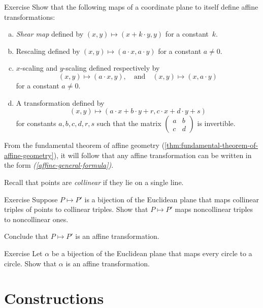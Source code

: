 \begin{thm}[!]{Exercise}\label{ex:afine-linear}
Show that the following maps of a coordinate plane to itself define affine transformations:
\begin{enumerate}[(a)]
\item\label{ex:afine-linear:shear} \emph{Shear map} defined by $(x,y)\mapsto (x+k\cdot y,y)$ for a constant~$k$.
\item\label{ex:afine-linear:scaling}
Rescaling defined by $(x,y)\mapsto (a\cdot x,a\cdot y)$ for a constant $a\ne 0$.
\item $x$-scaling and $y$-scaling defined respectively by 
\[(x,y)\mapsto (a\cdot x,y),\quad\text{and}\quad(x,y)\mapsto (x,a\cdot y)\]
for a constant $a\ne 0$.
\item\label{affine-general-formula} A transformation defined by
\[(x,y)\mapsto(a\cdot x+b\cdot y+r,c\cdot x+d\cdot y+s)\]
for constants $a,b,c,d,r,s$ such that the matrix $(\begin{smallmatrix}a&b\\c&d\end{smallmatrix})$ is invertible. 
\end{enumerate}
\end{thm}

From the fundamental theorem of affine geometry (\ref{thm:fundamental-theorem-of-affine-geometry}), it will follow that any affine transformation can be written in the form \textit{(\ref{affine-general-formula})}.

Recall that points are \emph{collinear} if they lie on a single line.

\begin{thm}{Exercise}\label{ex:collinear=affine}
Suppose $P\mapsto P'$ is a bijection of the Euclidean plane that maps collinear triples of points to collinear triples.
Show that $P\mapsto P'$ maps noncollinear triples to noncollinear ones.

Conclude that $P\mapsto P'$ is an affine transformation.
\end{thm}

\begin{thm}{Exercise}\label{ex:circle=affine}
Let $\alpha$ be a bijection of the Euclidean plane that maps every circle to a circle.
Show that $\alpha$ is an affine transformation.
\end{thm}

\section{Constructions}


